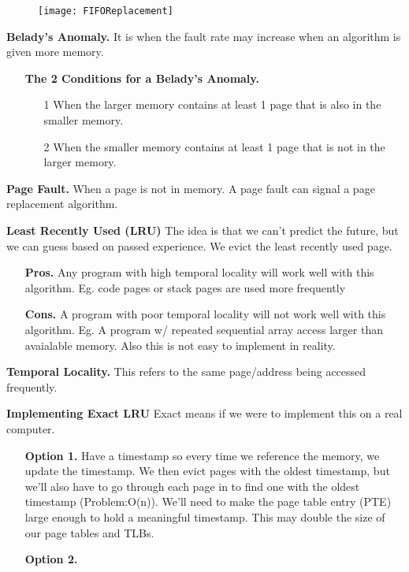 \documentclass[12pt]{article}
\begin{document}
\begin{figure}[htbp]
  \centering
  \texttt{[image: FIFOReplacement]} 
\end{figure}
\vspace{4em}
{\bf Belady's Anomaly.} {It is when the fault rate may increase when an algorithm is given more memory.}
    \begin{enumerate}
        \item[]{\bf The 2 Conditions for a Belady's Anomaly.}
        \begin{enumerate}
            \item[1]{When the larger memory contains at least 1 page that is also in the smaller memory.}
            \item[2]{When the smaller memory contains at least 1 page that is not in the larger memory.} 
        \end{enumerate}
    \end{enumerate}

{\bf Page Fault.} {When a page is not in memory. A page fault can signal a page replacement algorithm.}

{\bf Least Recently Used (LRU)} {The idea is that we can't predict the future, but we can guess based on passed experience. We evict the least recently used page.}
    \begin{enumerate}
        \item[]{\bf Pros.} {Any program with high temporal locality will work well with this algorithm. Eg. code pages or stack pages are used more frequently}
        \item[]{\bf Cons.} {A program with poor temporal locality will not work well with this algorithm. Eg. A program w/ repeated sequential array access larger than avaialable memory. Also this is not easy to implement in reality.}
    \end{enumerate}

{\bf Temporal Locality.} {This refers to the same page/address being accessed frequently.}

{\bf Implementing Exact LRU} {Exact means if we were to implement this on a real computer.}
    \begin{enumerate}
        \item[]{\bf Option 1.} {Have a timestamp so every time we reference the memory, we update the timestamp. We then evict pages with the oldest timestamp, but we'll also have to go through each page in to find one with the oldest timestamp (Problem:O(n)). We'll need to make the page table entry (PTE) large enough to hold a meaningful timestamp. This may double the size of our page tables and TLBs.}
        \item[]{\bf Option 2.} {}
    \end{enumerate}
\end{document}
